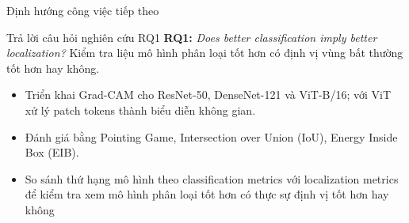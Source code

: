 \documentclass[10pt]{beamer}
\begin{document}
\begin{frame}{Định hướng công việc tiếp theo}
    \begin{block}{Trả lời câu hỏi nghiên cứu RQ1}
        \small
        \textbf{RQ1:} \textit{Does better classification imply better localization?} Kiểm tra liệu mô hình phân loại tốt hơn có định vị vùng bất thường tốt hơn hay không.
        \begin{itemize}
            \item Triển khai Grad-CAM cho ResNet-50, DenseNet-121 và ViT-B/16; với ViT xử lý patch tokens thành biểu diễn không gian.
            \item Đánh giá bằng Pointing Game, Intersection over Union (IoU), Energy Inside Box (EIB).
            \item So sánh thứ hạng mô hình theo classification metrics với localization metrics để kiểm tra xem mô hình phân loại tốt hơn có thực sự định vị tốt hơn hay không
        \end{itemize}
    \end{block}
\end{frame}
\end{document}
